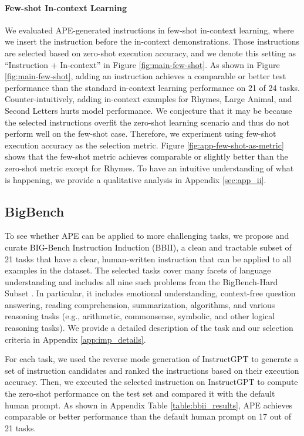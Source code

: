 \paragraph{Few-shot In-context Learning}
We evaluated APE-generated instructions in  few-shot in-context learning, where we insert the instruction before the in-context demonstrations. Those instructions are selected based on zero-shot execution accuracy, and we denote this setting as ``Instruction + In-context'' in Figure \ref{fig:main-few-shot}. As shown in Figure \ref{fig:main-few-shot}, adding an instruction achieves a comparable or better test performance than the standard in-context learning performance on 21 of 24 tasks. Counter-intuitively, adding in-context examples for Rhymes, Large Animal, and Second Letters hurts model performance. We conjecture that it may be because the selected instructions overfit the zero-shot learning scenario and thus do not perform well on the few-shot case. Therefore, we experiment using few-shot execution accuracy as the selection metric. Figure \ref{fig:app-few-shot-as-metric} shows that the few-shot metric achieves comparable or slightly better than the zero-shot metric except for Rhymes. To have an intuitive understanding of what is happening, we provide a qualitative analysis in Appendix \ref{sec:app_ii}. 

\subsection{BigBench}\label{sec:bigbench}
To see whether APE can be applied to more challenging tasks, we propose and curate BIG-Bench Instruction Induction (BBII), a clean and tractable subset of 21 tasks that have a clear, human-written instruction that can be applied to all examples in the dataset. The selected tasks cover many facets of language understanding and includes all nine such problems from the BigBench-Hard Subset \citep{suzgun2022challenging}. In particular, it includes emotional understanding, context-free question answering, reading comprehension, summarization, algorithms, and various reasoning tasks (e.g., arithmetic, commonsense, symbolic, and other logical reasoning tasks). We provide a detailed description of the task and our selection criteria in Appendix \ref{app:imp_details}. 

For each task, we used the reverse mode generation of InstructGPT to generate a set of instruction candidates and ranked the instructions based on their execution accuracy. Then, we executed the selected instruction on InstructGPT to compute the zero-shot performance on the test set and compared it with the default human prompt. As shown in Appendix Table \ref{table:bbii_results}, APE achieves comparable or better performance than the default human prompt on 17 out of 21 tasks.

